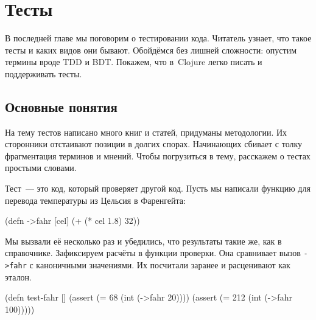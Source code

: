 \chapter{Тесты}


\label{chapter-tests}

\begin{teaser}
В последней главе мы поговорим о тестировании кода. Читатель узнает, что такое
тесты и каких видов они бывают. Обойдёмся без лишней сложности: опустим
термины вроде TDD и BDT. Покажем, что в~Clojure легко писать и
поддерживать тесты.
\end{teaser}

\section{Основные понятия}

На тему тестов написано много книг и статей, придуманы методологии. Их
сторонники отстаивают позиции в долгих спорах. Начинающих сбивает с толку
фрагментация терминов и мнений. Чтобы погрузиться в тему, расскажем о тестах
простыми словами.


Тест~--- это код, который проверяет другой код. Пусть мы написали функцию для
перевода температуры из Цельсия в Фаренгейта:

\begin{english}
  \begin{clojure}
(defn ->fahr [cel]
  (+ (* cel 1.8) 32))
  \end{clojure}
\end{english}


Мы вызвали её несколько раз и убедились, что результаты такие же, как в
справочнике. Зафиксируем расчёты в функции проверки. Она сравнивает вызов
\verb|->fahr| с каноничными значениями. Их посчитали заранее и расценивают как
эталон.

\begin{english}
  \begin{clojure}
(defn test-fahr []
  (assert (=  68 (int (->fahr 20))))
  (assert (= 212 (int (->fahr 100)))))
  \end{clojure}
\end{english}



